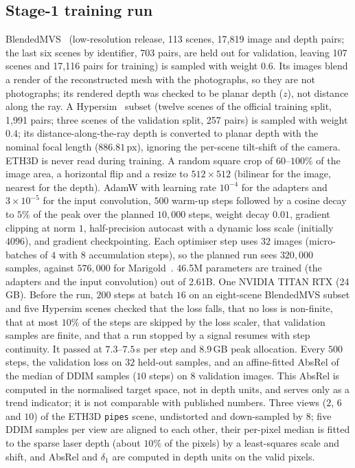 \subsection{Stage-1 training run}
\label{sec:stage1-setup}
 BlendedMVS~\cite{yao2020blendedmvs} (low-resolution release, 113 scenes, 17{,}819 image and depth pairs; the last six scenes by identifier, 703 pairs, are held out for validation, leaving 107 scenes and 17{,}116 pairs for training) is sampled with weight $0.6$.
Its images blend a render of the reconstructed mesh with the photographs, so they are not photographs; its rendered depth was checked to be planar depth ($z$), not distance along the ray.
A Hypersim~\cite{roberts2021hypersim} subset (twelve scenes of the official training split, 1{,}991 pairs; three scenes of the validation split, 257 pairs) is sampled with weight $0.4$; its distance-along-the-ray depth is converted to planar depth with the nominal focal length ($886.81$\,px), ignoring the per-scene tilt-shift of the camera.
ETH3D is never read during training.
 A random square crop of $60$--$100\%$ of the image area, a horizontal flip and a resize to $512\times512$ (bilinear for the image, nearest for the depth).
 AdamW with learning rate $10^{-4}$ for the adapters and $3\times10^{-5}$ for the input convolution, $500$ warm-up steps followed by a cosine decay to $5\%$ of the peak over the planned $10{,}000$ steps, weight decay $0.01$, gradient clipping at norm $1$, half-precision autocast with a dynamic loss scale (initially $4096$), and gradient checkpointing.
Each optimiser step uses $32$ images (micro-batches of $4$ with $8$ accumulation steps), so the planned run sees $320{,}000$ samples, against $576{,}000$ for Marigold~\cite{ke2024marigold}.
46.5M parameters are trained (the adapters and the input convolution) out of 2.61B.
 One NVIDIA TITAN RTX (24\,GB).
 Before the run, $200$ steps at batch $16$ on an eight-scene BlendedMVS subset and five Hypersim scenes checked that the loss falls, that no loss is non-finite, that at most $10\%$ of the steps are skipped by the loss scaler, that validation samples are finite, and that a run stopped by a signal resumes with step continuity.
It passed at $7.3$--$7.5$\,s per step and $8.9$\,GB peak allocation.
 Every $500$ steps, the validation loss on $32$ held-out samples, and an affine-fitted AbsRel of the median of DDIM samples ($10$ steps) on $8$ validation images.
This AbsRel is computed in the normalised target space, not in depth units, and serves only as a trend indicator; it is not comparable with published numbers.
 Three views ($2$, $6$ and $10$) of the ETH3D \texttt{pipes} scene, undistorted and down-sampled by $8$; five DDIM samples per view are aligned to each other, their per-pixel median is fitted to the sparse laser depth (about $10\%$ of the pixels) by a least-squares scale and shift, and AbsRel and $\delta_1$ are computed in depth units on the valid pixels.
